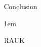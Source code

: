 \begin{frame}{Conclusion}

    \begin{itemize-size}{1em}
        \item RAUK
    \end{itemize-size}
    
\end{frame}
